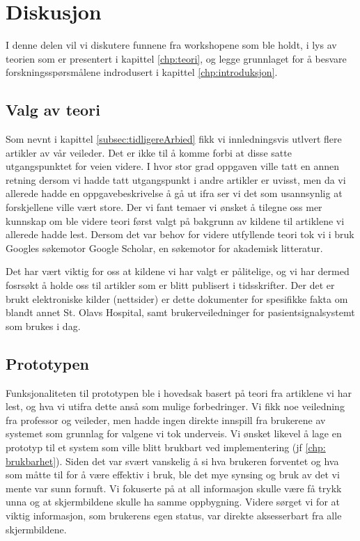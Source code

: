 \chapter{Diskusjon}
\label{chp:diskusjon}
I denne delen vil vi diskutere funnene fra workshopene som ble holdt, i lys av teorien som er presentert i kapittel \ref{chp:teori}, og legge grunnlaget for å besvare forskningsspørsmålene indrodusert i kapittel \ref{chp:introduksjon}.

\section{Valg av teori}
Som nevnt i kapittel \ref{subsec:tidligereArbied} fikk vi innledningsvis utlvert flere artikler av vår veileder. Det er ikke til å komme forbi at disse satte utgangspunktet for veien videre. I hvor stor grad oppgaven ville tatt en annen retning dersom vi hadde tatt utgangspunkt i andre artikler er uvisst, men da vi allerede hadde en oppgavebeskrivelse å gå ut ifra ser vi det som usannsynlig at forskjellene ville vært store.
Der vi fant temaer vi ønsket å tilegne oss mer kunnskap om ble videre teori først valgt på bakgrunn av kildene til artiklene vi allerede hadde lest. Dersom det var behov for videre utfyllende teori tok vi i bruk Googles søkemotor Google Scholar, en søkemotor for akademisk litteratur. 

\noindent
Det har vært viktig for oss at kildene vi har valgt er pålitelige, og vi har dermed fosrsøkt å holde oss til artikler som er blitt publisert i tidsskrifter. Der det er brukt elektroniske kilder (nettsider) er dette dokumenter for spesifikke fakta om blandt annet St. Olavs Hospital, samt brukerveiledninger for pasientsignalsystemt som brukes i dag. 

\section{Prototypen}
\label{protoDisk}
Funksjonaliteten til prototypen ble i hovedsak basert på teori fra artiklene vi har lest, og hva vi utifra dette anså som mulige forbedringer. Vi fikk noe veiledning fra professor og veileder, men hadde ingen direkte innspill fra brukerene av systemet som grunnlag for valgene vi tok underveis.
Vi ønsket likevel å lage en prototyp til et system som ville blitt brukbart ved implementering (jf \ref{chp: brukbarhet}). Siden det var svært vanskelig å si hva brukeren forventet og hva som måtte til for å være effektiv i bruk, ble det mye synsing og bruk av det vi mente var sunn fornuft. Vi fokuserte på at all informasjon skulle være få trykk unna og at skjermbildene skulle ha samme oppbygning. Videre sørget vi for at viktig informasjon, som brukerens egen status, var direkte aksesserbart fra alle skjermbildene. 

